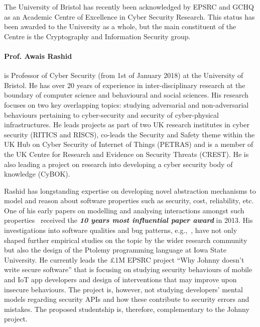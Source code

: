 \documentclass[10pt]{article}
\begin{document}
The University of Bristol has recently been acknowledged by 
EPSRC and GCHQ as an Academic Centre of Excellence in Cyber Security
Research. This status has been awarded to the University as a whole,
but the main constituent of the Centre is the Cryptography and Information
Security group.
\fi


\paragraph{Prof. Awais Rashid} is Professor of Cyber Security (from 1st of January 2018) at the University of Bristol. He has over 20 years of experience in inter-disciplinary research at the boundary of computer science and behavioural and social sciences. His research focuses on two key overlapping topics: studying adversarial and non-adversarial behaviours pertaining to cyber-security and security of cyber-physical infrastructures. He leads projects as part of two UK research institutes in cyber security (RITICS and RISCS), co-leads the Security and Safety theme within the UK Hub on Cyber Security of Internet of Things (PETRAS) and is a member of the UK Centre for Research and Evidence on Security Threats (CREST). He is also leading a project on research into developing a cyber security body of knowledge (CyBOK).

Rashid has longstanding expertise on developing novel abstraction mechanisms to model and reason about software properties such as security, cost, reliability, etc. One of his early papers on modelling and analysing interactions amongst such properties~\cite{rashid2003} received the \textit{\textbf{10 years most influential paper award}} in 2013. His investigations into software qualities and bug patterns, e.g.,~\cite{greenwood2007, coelho2008}, have not only shaped further empirical studies on the topic by the wider research community but also the design of the Ptolemy programming language at Iowa State University. He currently leads the \pounds1M EPSRC project ``Why Johnny doesn't write secure software'' that is focusing on studying security behaviours of mobile and IoT app developers and design of interventions that may improve upon insecure behaviours. The project is, however, not studying developers' mental models regarding security APIs and how these contribute to security errors and mistakes. The proposed studentship is, therefore, complementary to the Johnny project.
\end{document}
